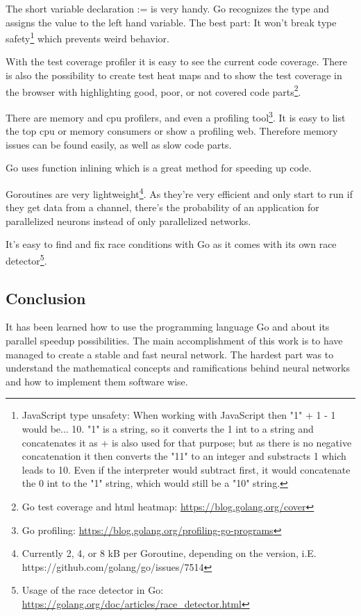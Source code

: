 \documentclass[11pt]{article}
\begin{document}
The short variable declaration := is very handy. Go recognizes the type and assigns the value to the left hand variable. The best part: It won't break type safety\footnote{JavaScript type unsafety: When working with JavaScript then "1" + 1 - 1 would be... 10. "1" is a string, so it converts the 1 int to a string and concatenates it as + is also used for that purpose; but as there is no negative concatenation it then converts the "11" to an integer and substracts 1 which leads to 10. Even if the interpreter would subtract first, it would concatenate the 0 int to the "1" string, which would still be a "10" string.} which prevents weird behavior.

With the test coverage profiler it is easy to see the current code coverage. There is also the possibility to create test heat maps and to show the test coverage in the browser with highlighting good, poor, or not covered code parts\footnote{Go test coverage and html heatmap: \url{https://blog.golang.org/cover}}.

There are memory and cpu profilers, and even a profiling tool\footnote{Go profiling: \url{https://blog.golang.org/profiling-go-programs}}. It is easy to list the top cpu or memory consumers or show a profiling web. Therefore memory issues can be found easily, as well as slow code parts.

Go uses function inlining which is a great method for speeding up code.

Goroutines are very lightweight\footnote{Currently 2, 4, or 8 kB per Goroutine, depending on the version, i.E. https://github.com/golang/go/issues/7514}. As they're very efficient and only start to run if they get data from a channel, there's the probability of an application for parallelized neurons instead of only parallelized networks.

It's easy to find and fix race conditions with Go as it comes with its own race detector\footnote{Usage of the race detector in Go: \url{https://golang.org/doc/articles/race_detector.html}}.

\subsection{Conclusion}
It has been learned how to use the programming language Go and about its parallel speedup possibilities.
The main accomplishment of this work is to have managed to create a stable and fast neural network.
The hardest part was to understand the mathematical concepts and ramifications behind neural networks and how to implement them software wise.
\end{document}
